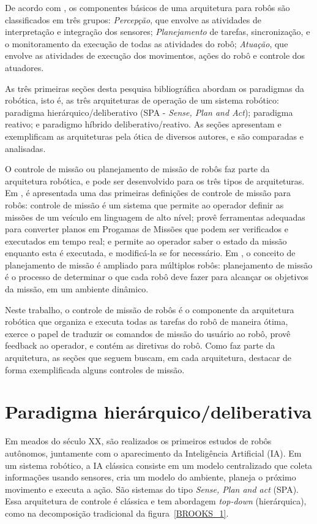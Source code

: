 De acordo com \cite{siegwart2004autonomous}, os componentes básicos de uma
arquitetura para robôs são classificados em três grupos: \textit{Percepção}, que
envolve as atividades de interpretação e integração dos sensores;
\textit{Planejamento} de tarefas, sincronização,
e o monitoramento da execução de todas as atividades do robô; \textit{Atuação},
que envolve as atividades de execução dos movimentos, ações do robô e controle
dos atuadores.

As três primeiras seções desta pesquisa bibliográfica abordam os paradigmas da
robótica, isto é, as três arquiteturas de operação de um sistema robótico:
paradigma hierárquico/deliberativo (SPA - \emph{Sense, Plan and Act}); paradigma
reativo; e paradigmo híbrido deliberativo/reativo. As seções apresentam e
exemplificam as arquiteturas pela ótica de diversos autores, e são
comparadas e analisadas.

O controle de missão ou planejamento de missão de robôs faz parte da arquitetura
robótica, e pode ser desenvolvido para os três tipos de arquiteturas. Em
\cite{fryxell1996navigation}, é apresentada uma das primeiras definições de
controle de missão para robôs: controle de missão é um sistema que permite ao
operador definir as missões de um veículo em linguagem de alto nível; provê
ferramentas adequadas para converter planos em Progamas de Missões que podem
ser verificados e executados em tempo real; e permite ao operador saber o
estado da missão enquanto esta é executada, e modificá-la se for necessário. Em
\cite{brumitt1996dynamic}, o conceito de planejamento de missão é ampliado para
múltiplos robôs: planejamento de missão é o processo de determinar o
que cada robô deve fazer para alcançar os objetivos da missão, em um ambiente
dinâmico. 

Neste trabalho, o controle de missão de robôs é o componente da arquitetura
robótica que organiza e executa todas as tarefas do robô de maneira ótima,
exerce o papel de traduzir os comandos de missão do usuário ao robô, provê feedback ao
operador, e contém as diretivas do robô. Como faz parte da arquitetura, as
seções que seguem buscam, em cada arquitetura, destacar de forma exemplificada
alguns controles de missão.

\section{Paradigma hierárquico/deliberativa}
Em meados do século XX, são realizados os primeiros estudos de robôs autônomos,
juntamente com o aparecimento da Inteligência Artificial (IA). Em um sistema
robótico, a IA clássica consiste em um modelo centralizado que coleta
informações usando sensores, cria um modelo do ambiente, planeja o próximo
movimento e executa a ação. São sistemas do tipo \emph{Sense, Plan and
act} (SPA). Essa arquitetura de controle é clássica e tem abordagem
\emph{top-down} (hierárquica), como na decomposição tradicional da
figura~\ref{BROOKS_1}.

